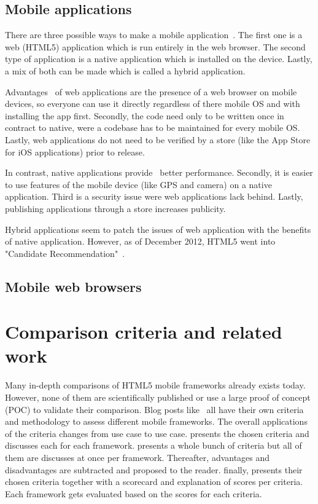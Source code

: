 \documentclass[a4paper]{artikel3}
\begin{document}
\subsection{Mobile applications}
There are three possible ways to make a mobile application~\cite{Accenture2012,Hales2012}.
The first one is a web (HTML5) application which is run entirely in the web browser.
The second type of application is a native application which is installed on the device.
Lastly, a mix of both can be made which is called a hybrid application.

Advantages~\cite{Accenture2012} of web applications are the presence of a web browser on mobile devices, so everyone can use it directly regardless of there mobile OS and with installing the app first.
Secondly, the code need only to be written once in contract to native, were a codebase has to be maintained for every mobile OS.
Lastly, web applications do not need to be verified by a store (like the App Store for iOS applications) prior to release.

In contrast, native applications provide~\cite{Accenture2012} better performance.
Secondly, it is easier to use features of the mobile device (like GPS and camera) on a native application.
Third is a security issue were web applications lack behind.
Lastly, publishing applications through a store increases publicity.

Hybrid applications seem to patch the issues of web application with the benefits of native application.
However, as of December 2012, HTML5 went into "Candidate Recommendation"~\cite{Jacobs2012}.

\subsection{Mobile web browsers}


\section{Comparison criteria and related work}
\label{sec:comparisoncriteria}


Many in-depth comparisons of HTML5 mobile frameworks already exists today.  However, none of them are scientifically published or use a large proof of concept (POC) to validate their comparison.  Blog posts like~\cite{Sarrafi2012a,Ayuso2012,Rozynski2011} all have their own criteria and methodology to assess different mobile frameworks.  The overall applications of the criteria changes from use case to use case.  \cite{Rozynski2011} presents the chosen criteria and discusses each for each framework.  \cite{Ayuso2012} presents a whole bunch of criteria but all of them are discusses at once per framework.  Thereafter,  advantages and disadvantages are subtracted and proposed to the reader.  \cite{Sarrafi2012a} finally,  presents their chosen criteria together with a scorecard and explanation of scores per criteria.  Each framework gets evaluated based on the scores for each criteria.
\end{document}

